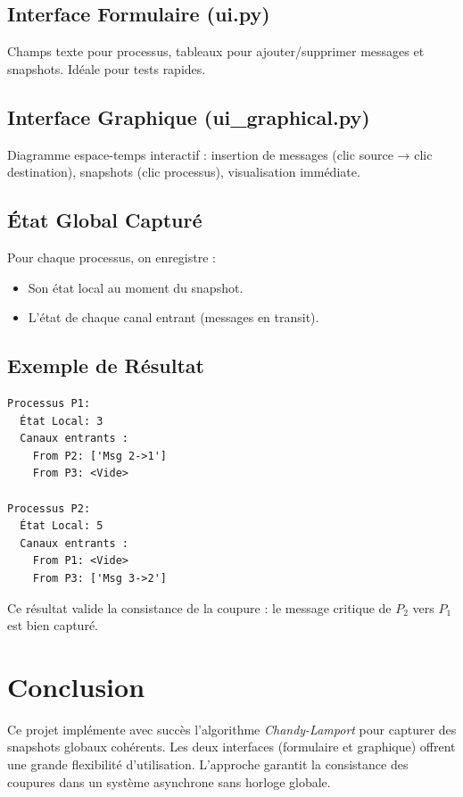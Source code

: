 \documentclass{article}
\begin{document}
\subsection{Interface Formulaire (ui.py)}

Champs texte pour processus, tableaux pour ajouter/supprimer messages et snapshots. Idéale pour tests rapides.

\subsection{Interface Graphique (ui\_graphical.py)}

Diagramme espace-temps interactif : insertion de messages (clic source → clic destination), snapshots (clic processus), visualisation immédiate.

\subsection{État Global Capturé}

Pour chaque processus, on enregistre :
\begin{itemize}
    \item Son état local au moment du snapshot.
    \item L'état de chaque canal entrant (messages en transit).
\end{itemize}

\subsection{Exemple de Résultat}

\begin{verbatim}
Processus P1:
  État Local: 3
  Canaux entrants :
    From P2: ['Msg 2->1']
    From P3: <Vide>

Processus P2:
  État Local: 5
  Canaux entrants :
    From P1: <Vide>
    From P3: ['Msg 3->2']
\end{verbatim}

Ce résultat valide la consistance de la coupure : le message critique de $P_2$ vers $P_1$ est bien capturé.

\section{Conclusion}

Ce projet implémente avec succès l'algorithme \textit{Chandy-Lamport} pour capturer des snapshots globaux cohérents. Les deux interfaces (formulaire et graphique) offrent une grande flexibilité d'utilisation. L'approche garantit la consistance des coupures dans un système asynchrone sans horloge globale.
\end{document}

